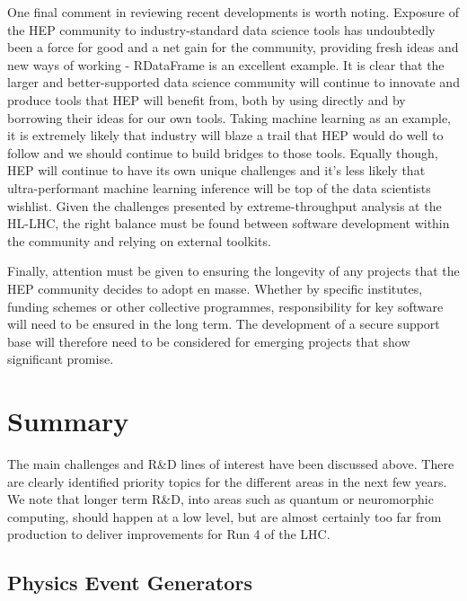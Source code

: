 \documentclass[11pt,a4paper]{article}
\begin{document}
One final comment in reviewing recent developments is worth noting.
Exposure of the HEP community to industry-standard data science tools
has undoubtedly been a force for good and a net gain for the community,
providing fresh ideas and new ways of working - RDataFrame is an
excellent example. It is clear that the larger and better-supported data
science community will continue to innovate and produce tools that HEP
will benefit from, both by using directly and by borrowing their ideas
for our own tools. Taking machine learning as an example, it is
extremely likely that industry will blaze a trail that HEP would do well
to follow and we should continue to build bridges to those tools.
Equally though, HEP will continue to have its own unique challenges and
it's less likely that ultra-performant machine learning inference will
be top of the data scientists wishlist. Given the challenges presented
by extreme-throughput analysis at the HL-LHC, the right balance must be
found between software development within the community and relying on
external toolkits.

Finally, attention must be given to ensuring the longevity of any
projects that the HEP community decides to adopt en masse. Whether by
specific institutes, funding schemes or other collective programmes,
responsibility for key software will need to be ensured in the long
term. The development of a secure support base will therefore need to be
considered for emerging projects that show significant promise.


\hypertarget{summary}{%
\section{Summary}\label{summary}}

The main challenges and R\&D lines of interest have been discussed
above. There are clearly identified priority topics for the different
areas in the next few years. We note that longer term R\&D, into areas
such as quantum or neuromorphic computing, should happen at a low level,
but are almost certainly too far from production to deliver improvements
for Run 4 of the LHC.

\hypertarget{physics-event-generators-1}{%
\subsection{Physics Event Generators}\label{physics-event-generators-1}}
\end{document}
